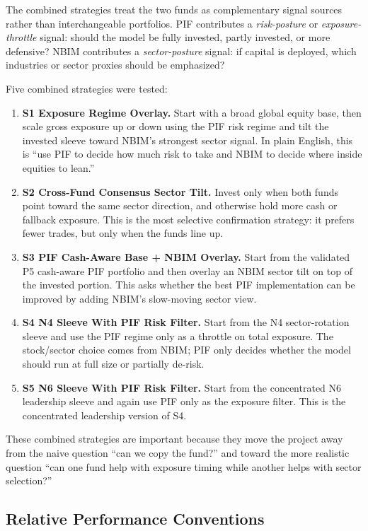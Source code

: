 \documentclass[conference]{IEEEtran}
\begin{document}
The combined strategies treat the two funds as complementary signal sources rather than interchangeable portfolios. PIF contributes a \emph{risk-posture} or \emph{exposure-throttle} signal: should the model be fully invested, partly invested, or more defensive? NBIM contributes a \emph{sector-posture} signal: if capital is deployed, which industries or sector proxies should be emphasized?

Five combined strategies were tested:
\begin{enumerate}[leftmargin=1.4em]
    \item \textbf{S1 Exposure Regime Overlay.} Start with a broad global equity base, then scale gross exposure up or down using the PIF risk regime and tilt the invested sleeve toward NBIM's strongest sector signal. In plain English, this is ``use PIF to decide how much risk to take and NBIM to decide where inside equities to lean.''
    \item \textbf{S2 Cross-Fund Consensus Sector Tilt.} Invest only when both funds point toward the same sector direction, and otherwise hold more cash or fallback exposure. This is the most selective confirmation strategy: it prefers fewer trades, but only when the funds line up.
    \item \textbf{S3 PIF Cash-Aware Base + NBIM Overlay.} Start from the validated P5 cash-aware PIF portfolio and then overlay an NBIM sector tilt on top of the invested portion. This asks whether the best PIF implementation can be improved by adding NBIM's slow-moving sector view.
    \item \textbf{S4 N4 Sleeve With PIF Risk Filter.} Start from the N4 sector-rotation sleeve and use the PIF regime only as a throttle on total exposure. The stock/sector choice comes from NBIM; PIF only decides whether the model should run at full size or partially de-risk.
    \item \textbf{S5 N6 Sleeve With PIF Risk Filter.} Start from the concentrated N6 leadership sleeve and again use PIF only as the exposure filter. This is the concentrated leadership version of S4.
\end{enumerate}

These combined strategies are important because they move the project away from the naive question ``can we copy the fund?'' and toward the more realistic question ``can one fund help with exposure timing while another helps with sector selection?''

\subsection{Relative Performance Conventions}
\end{document}
